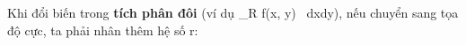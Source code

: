 \documentclass[preview]{standalone}
\begin{document}
\begin{center}
Khi đổi biến trong \textbf{tích phân đôi} (ví dụ \iint_R f(x, y) \, dxdy), nếu chuyển sang tọa độ cực, ta phải nhân thêm hệ số r:
\end{center}
\end{document}
